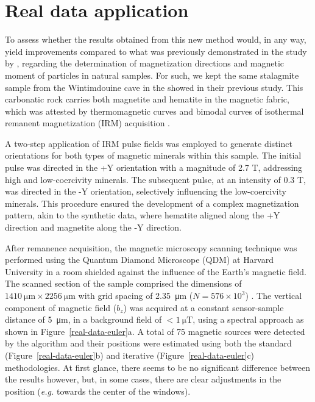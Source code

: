 \section{Real data application}

To assess whether the results obtained from this new method would, in any way, yield improvements compared to what was previously demonstrated in the study by \citet{Souza-Junior2023b}, regarding the determination of magnetization directions and magnetic moment of particles in natural samples. For such, we kept the same stalagmite sample from the Wintimdouine cave in the  \citep[Agadir (Morocco),][]{Ait2019Hydro} showed in their previous study. This carbonatic rock carries both magnetite and hematite in the magnetic fabric, which was attested by thermomagnetic curves and bimodal curves of isothermal remanent magnetization (IRM) acquisition \citep{carmo2019speleothem}.

A two-step application of IRM pulse fields was employed to generate distinct orientations for both types of magnetic minerals within this sample. The initial pulse was directed in the +Y orientation with a magnitude of 2.7 T, addressing high and low-coercivity minerals. The subsequent pulse, at an intensity of 0.3 T, was directed in the -Y orientation, selectively influencing the low-coercivity minerals. This procedure ensured the development of a complex magnetization pattern, akin to the synthetic data, where hematite aligned along the +Y direction and magnetite along the -Y direction.

After remanence acquisition, the magnetic microscopy scanning technique was performed using the Quantum
Diamond Microscope (QDM) at Harvard University in a room shielded against the influence of the Earth's magnetic field. The scanned section of the sample comprised the dimensions of $\qty{1410}{\um} \times \qty{2256}{\um}$ with grid spacing of \qty{2.35}{\um} ($N = 576 \times 10^{3}$) \citep{janinedata}. The vertical component of magnetic field ($b_z$) was acquired at a constant sensor-sample distance of \qty{5}{\um}, in a background field of $< \qty{1}{\micro\tesla}$, using a spectral approach \citep{Lima2009, Fu2020, Glenn2017} as shown in Figure~\ref{real-data-euler}a. A total of 75 magnetic sources were detected by the algorithm and their positions were estimated using both the standard (Figure~\ref{real-data-euler}b) and iterative (Figure~\ref{real-data-euler}c) methodologies. At first glance, there seems to be no significant difference between the results however, but, in some cases, there are clear adjustments in the position (\textit{e.g.} towards the center of the windows).

